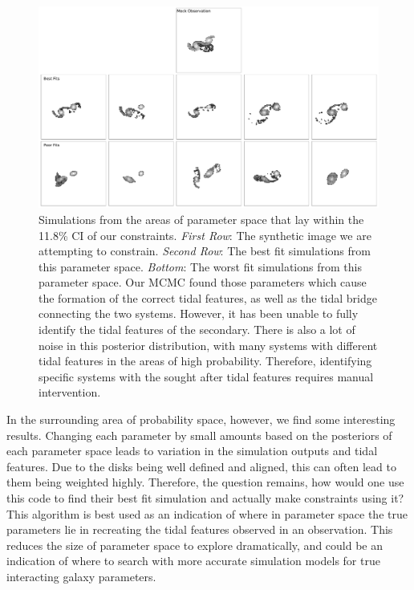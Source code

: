 \begin{figure}
    \centering
    \includegraphics[width=\textwidth]{Chapter1/figures/best-fits-comb.pdf}
    \caption{Simulations from the areas of parameter space that lay within the 11.8\% CI of our constraints. \textit{First Row}: The synthetic image we are attempting to constrain. \textit{Second Row}: The best fit simulations from this parameter space. \textit{Bottom}: The worst fit simulations from this parameter space. Our MCMC found those parameters which cause the formation of the correct tidal features, as well as the tidal bridge connecting the two systems. However, it has been unable to fully identify the tidal features of the secondary. There is also a lot of noise in this posterior distribution, with many systems with different tidal features in the areas of high probability. Therefore, identifying specific systems with the sought after tidal features requires manual intervention.}
    \label{fig:arp240_corner_plot}
\end{figure}

In the surrounding area of probability space, however, we find some interesting results. Changing each parameter by small amounts based on the posteriors of each parameter space leads to variation in the simulation outputs and tidal features. Due to the disks being well defined and aligned, this can often lead to them being weighted highly. Therefore, the question remains, how would one use this code to find their best fit simulation and actually make constraints using it? This algorithm is best used as an indication of where in parameter space the true parameters lie in recreating the tidal features observed in an observation. This reduces the size of parameter space to explore dramatically, and could be an indication of where to search with more accurate simulation models for true interacting galaxy parameters.

